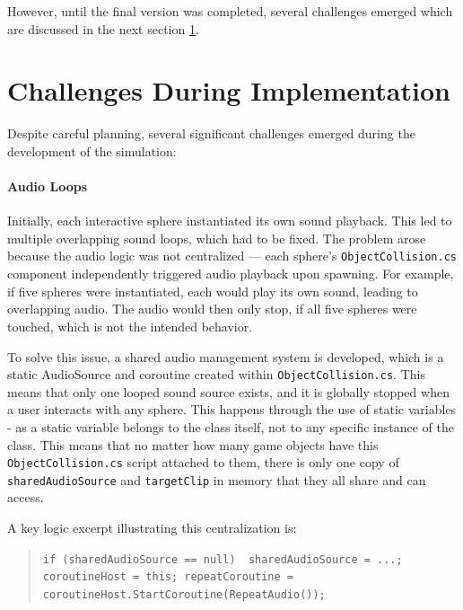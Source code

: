 \vspace{1em}

However, until the final version was completed, several challenges emerged which are discussed in the next section \ref{sec:challengesimplementation}.

\section{Challenges During Implementation} 
\label{sec:challengesimplementation}
Despite careful planning, several significant challenges emerged during the development of the simulation:

\paragraph{Audio Loops} 
Initially, each interactive sphere instantiated its own sound playback. This led to multiple overlapping sound loops, which had to be fixed. The problem arose because the audio logic was not centralized — each sphere's \texttt{ObjectCollision.cs} component independently triggered audio playback upon spawning. For example, if five spheres were instantiated, each would play its own sound, leading to overlapping audio. The audio would then only stop, if all five spheres were touched, which is not the intended behavior.

\vspace{1em}

To solve this issue, a shared audio management system is developed, which is a static AudioSource and coroutine created within \texttt{ObjectCollision.cs}. This means that only one looped sound source exists, and it is globally stopped when a user interacts with any sphere. This happens through the use of static variables - as a static variable belongs to the class itself, not to any specific instance of the class. This means that no matter how many game objects have this \texttt{ObjectCollision.cs} script attached to them, there is only one copy of \texttt{sharedAudioSource} and \texttt{targetClip} in memory that they all share and can access. 

A key logic excerpt illustrating this centralization is:

\begin{quote} \small \texttt{if (sharedAudioSource == null) { sharedAudioSource = ...; coroutineHost = this; repeatCoroutine = coroutineHost.StartCoroutine(RepeatAudio());}} \end{quote}

